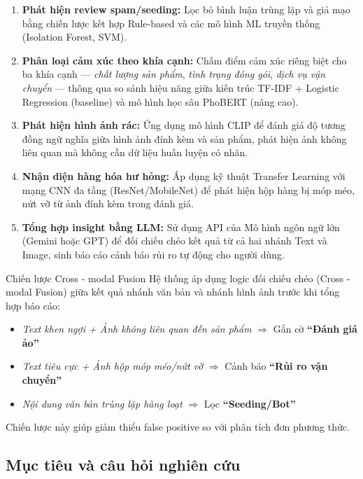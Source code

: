 \begin{enumerate}[labelsep=10pt, leftmargin=2cm]
    \item \textbf{Phát hiện review spam/seeding:} Lọc bỏ bình luận trùng lặp và giả mạo bằng chiến lược kết hợp Rule-based và các mô hình ML truyền thống (Isolation Forest, SVM).
    \item \textbf{Phân loại cảm xúc theo khía cạnh:} Chấm điểm cảm xúc riêng biệt cho ba khía cạnh --- \textit{chất lượng sản phẩm}, \textit{tình trạng đóng gói}, \textit{dịch vụ vận chuyển} --- thông qua so sánh hiệu năng giữa kiến trúc TF-IDF + Logistic Regression (baseline) và mô hình học sâu PhoBERT (nâng cao).
    \item \textbf{Phát hiện hình ảnh rác:} Ứng dụng mô hình CLIP để đánh giá độ tương đồng ngữ nghĩa giữa hình ảnh đính kèm và sản phẩm, phát hiện ảnh không liên quan mà không cần dữ liệu huấn luyện có nhãn.
    \item \textbf{Nhận diện hàng hóa hư hỏng:} Áp dụng kỹ thuật Transfer Learning với mạng CNN đa tầng (ResNet/MobileNet) để phát hiện hộp hàng bị móp méo, nứt vỡ từ ảnh đính kèm trong đánh giá.
    \item \textbf{Tổng hợp insight bằng LLM:} Sử dụng API của Mô hình ngôn ngữ lớn (Gemini hoặc GPT) để đối chiếu chéo kết quả từ cả hai nhánh Text và Image, sinh báo cáo cảnh báo rủi ro tự động cho người dùng.
\end{enumerate}

\begin{infobox}{Chiến lược Cross - modal Fusion}
Hệ thống áp dụng logic đối chiếu chéo (Cross - modal Fusion) giữa kết quả nhánh văn bản và nhánh hình ảnh trước khi tổng hợp báo cáo:
\begin{itemize}
    \item \textit{Text khen ngợi + Ảnh không liên quan đến sản phẩm} $\Rightarrow$ Gắn cờ \textbf{``Đánh giá ảo''}
    \item \textit{Text tiêu cực + Ảnh hộp móp méo/nứt vỡ} $\Rightarrow$ Cảnh báo \textbf{``Rủi ro vận chuyển''}
    \item \textit{Nội dung văn bản trùng lặp hàng loạt} $\Rightarrow$ Lọc \textbf{``Seeding/Bot''}
\end{itemize}
Chiến lược này giúp giảm thiểu false positive so với phân tích đơn phương thức.
\end{infobox}

\subsection{Mục tiêu và câu hỏi nghiên cứu}

